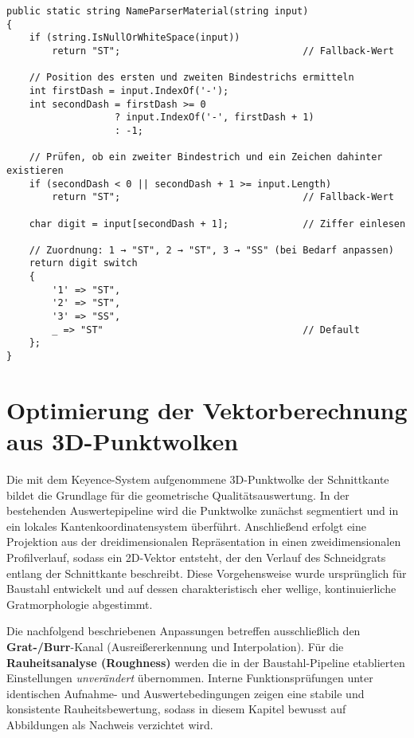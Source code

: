 \begin{lstlisting}[language={[Sharp]C}, caption={Werkstoffabhängiges Routing der Handscanner-Setups}, label={lst:messzellen-routing}]
public static string NameParserMaterial(string input)
{
    if (string.IsNullOrWhiteSpace(input))
        return "ST";                                // Fallback-Wert

    // Position des ersten und zweiten Bindestrichs ermitteln
    int firstDash = input.IndexOf('-');
    int secondDash = firstDash >= 0
                   ? input.IndexOf('-', firstDash + 1)
                   : -1;

    // Prüfen, ob ein zweiter Bindestrich und ein Zeichen dahinter existieren
    if (secondDash < 0 || secondDash + 1 >= input.Length)
        return "ST";                                // Fallback-Wert

    char digit = input[secondDash + 1];             // Ziffer einlesen

    // Zuordnung: 1 → "ST", 2 → "ST", 3 → "SS" (bei Bedarf anpassen)
    return digit switch
    {
        '1' => "ST",
        '2' => "ST",
        '3' => "SS",
        _ => "ST"                                   // Default
    };
}
\end{lstlisting}

\section{Optimierung der Vektorberechnung aus 3D-Punktwolken}

Die mit dem Keyence-System aufgenommene 3D-Punktwolke der Schnittkante bildet die Grundlage für die geometrische Qualitätsauswertung. In der bestehenden Auswertepipeline wird die Punktwolke zunächst segmentiert und in ein lokales Kantenkoordinatensystem überführt. Anschließend erfolgt eine Projektion aus der dreidimensionalen Repräsentation in einen zweidimensionalen Profilverlauf, sodass ein 2D-Vektor entsteht, der den Verlauf des Schneidgrats entlang der Schnittkante beschreibt. Diese Vorgehensweise wurde ursprünglich für Baustahl entwickelt und auf dessen charakteristisch eher wellige, kontinuierliche Gratmorphologie abgestimmt.

Die nachfolgend beschriebenen Anpassungen betreffen ausschließlich den \textbf{Grat-/Burr}-Kanal (Ausreißererkennung und Interpolation). Für die \textbf{Rauheitsanalyse (Roughness)} werden die in der Baustahl-Pipeline etablierten Einstellungen \emph{unverändert} übernommen. Interne Funktionsprüfungen unter identischen Aufnahme- und Auswertebedingungen zeigen eine stabile und konsistente Rauheitsbewertung, sodass in diesem Kapitel bewusst auf Abbildungen als Nachweis verzichtet wird.

